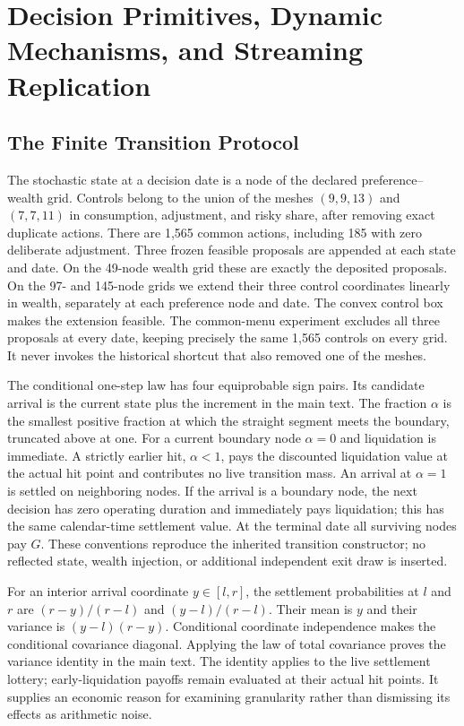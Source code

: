 \section{Decision Primitives, Dynamic Mechanisms, and Streaming Replication}
\label{sec:s12}
\subsection{The Finite Transition Protocol}
The stochastic state at a decision date is a node of the declared preference--wealth grid. Controls belong to the union of the meshes $(9,9,13)$ and $(7,7,11)$ in consumption, adjustment, and risky share, after removing exact duplicate actions. There are 1,565 common actions, including 185 with zero deliberate adjustment. Three frozen feasible proposals are appended at each state and date. On the 49-node wealth grid these are exactly the deposited proposals. On the 97- and 145-node grids we extend their three control coordinates linearly in wealth, separately at each preference node and date. The convex control box makes the extension feasible. The common-menu experiment excludes all three proposals at every date, keeping precisely the same 1,565 controls on every grid. It never invokes the historical shortcut that also removed one of the meshes.

The conditional one-step law has four equiprobable sign pairs. Its candidate arrival is the current state plus the increment in the main text. The fraction $\alpha$ is the smallest positive fraction at which the straight segment meets the boundary, truncated above at one. For a current boundary node $\alpha=0$ and liquidation is immediate. A strictly earlier hit, $\alpha<1$, pays the discounted liquidation value at the actual hit point and contributes no live transition mass. An arrival at $\alpha=1$ is settled on neighboring nodes. If the arrival is a boundary node, the next decision has zero operating duration and immediately pays liquidation; this has the same calendar-time settlement value. At the terminal date all surviving nodes pay $G$. These conventions reproduce the inherited transition constructor; no reflected state, wealth injection, or additional independent exit draw is inserted.

For an interior arrival coordinate $y\in[l,r]$, the settlement probabilities at $l$ and $r$ are $(r-y)/(r-l)$ and $(y-l)/(r-l)$. Their mean is $y$ and their variance is $(y-l)(r-y)$. Conditional coordinate independence makes the conditional covariance diagonal. Applying the law of total covariance proves the variance identity in the main text. The identity applies to the live settlement lottery; early-liquidation payoffs remain evaluated at their actual hit points. It supplies an economic reason for examining granularity rather than dismissing its effects as arithmetic noise.

